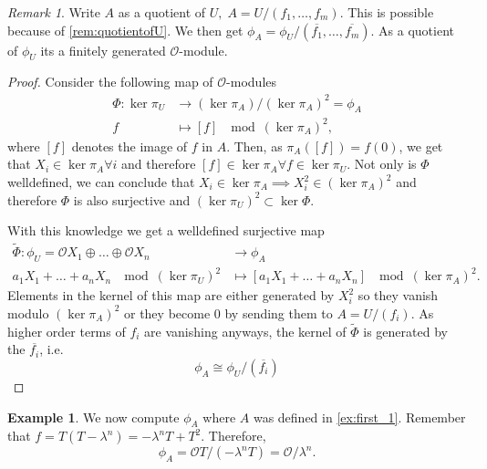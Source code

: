 \documentclass{article}
\theoremstyle{plain}%
\theoremstyle{definition}
\newtheorem{example}[theorem]{Example}
\theoremstyle{remark}
\newtheorem{remark}[theorem]{Remark}
\begin{document}
\begin{remark}\label{rem:tangentspace}
    Write \(A\) as a quotient of \(U,\; A = U/(f_1, \dots, f_m)\). 
    This is possible because of \cref{rem:quotientofU}.
    We then get \(\phi_A = \phi_U/(\overline{f_1}, \dots, \overline{f_m})\).
    As a quotient of \(\phi_U\) its a finitely generated \(\mathcal{O}\)-module.
\end{remark}
\begin{proof}
    Consider the following map of \(\mathcal{O}\)-modules
    \begin{align*}
        \Phi\colon \ker \pi_U &\to (\ker \pi_A)/(\ker \pi_A)^2 = \phi_A\\
        f &\mapsto [f] \; \mod (\ker \pi_A)^2,
    \end{align*}
    where \([f]\) denotes the image of \(f\) in \(A\).
    Then, as \(\pi_A([f]) = f(0)\), we get that \(X_i \in \ker \pi_A \forall i\)
    and therefore \([f] \in \ker \pi_A \forall f \in \ker \pi_U\). Not only is \(\Phi\) welldefined,
    we can conclude that \(X_i \in \ker \pi_A \implies X_i^2 \in (\ker \pi_A)^2\)
    and therefore \(\Phi\) is also surjective and \((\ker \pi_U)^2 \subset \ker \Phi\).
    
    With this knowledge we get a welldefined surjective map
    \begin{align*}
        \tilde \Phi\colon \phi_U = \mathcal{O}X_1 \oplus \dots \oplus \mathcal{O}X_n &\to \phi_A\\
        a_1X_1 + \dots + a_nX_n \; \mod (\ker \pi_U)^2 &\mapsto [a_1X_1 + \dots + a_nX_n] \; \mod (\ker \pi_A)^2.
    \end{align*}
    Elements in the kernel of this map are either generated by \(X_i^2\) so they vanish modulo \((\ker \pi_A)^2\)
    or they become 0 by sending them to \(A = U/(f_i)\).
    As higher order terms of \(f_i\) are vanishing anyways, 
    the kernel of \(\tilde \Phi\) is generated by the \(\overline{f_i}\), i.e.
    \[
        \phi_A \cong \phi_U/(\overline{f_i})  
    \]
\end{proof}

\begin{example}\label{ex:first_phi}
    We now compute \(\phi_A\) where \(A\) was defined in \cref{ex:first_1}.
    Remember that \(f = T(T-\lambda^n) = -\lambda^n T + T^2\). Therefore,
    \[\phi_A = \mathcal{O}T/(-\lambda^n T) = \mathcal{O}/\lambda^n.\]
\end{example}
\end{document}

